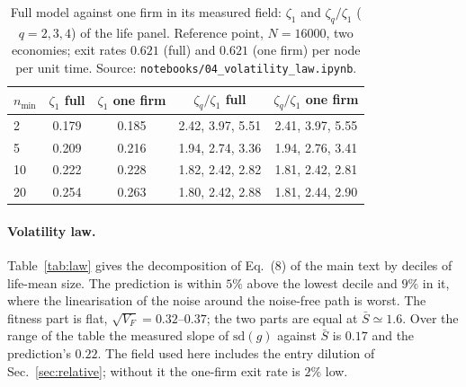 \documentclass[pre,onecolumn,superscriptaddress,nofootinbib]{revtex4-2}
\newcommand{\Sb}{\bar S}
\begin{document}
\begin{table}[h]
\caption{Full model against one firm in its measured field: $\zeta_1$ and $\zeta_q/\zeta_1$ ($q=2,3,4$) of the
life panel.  Reference point, $N=16000$, two economies; exit rates $0.621$ (full) and $0.621$ (one
firm) per node per unit time.  Source: \texttt{notebooks/04\_volatility\_law.ipynb}.}
\label{tab:reduction}
\begin{ruledtabular}
\begin{tabular}{lcccc}
$n_{\min}$ & $\zeta_1$ full & $\zeta_1$ one firm & $\zeta_q/\zeta_1$ full & $\zeta_q/\zeta_1$ one firm\\
\hline
2  & 0.179 & 0.185 & 2.42, 3.97, 5.51 & 2.41, 3.97, 5.55\\
5  & 0.209 & 0.216 & 1.94, 2.74, 3.36 & 1.94, 2.76, 3.41\\
10 & 0.222 & 0.228 & 1.82, 2.42, 2.82 & 1.81, 2.42, 2.81\\
20 & 0.254 & 0.263 & 1.80, 2.42, 2.88 & 1.81, 2.44, 2.90\\
\end{tabular}
\end{ruledtabular}
\end{table}

\paragraph{Volatility law.}  Table~\ref{tab:law} gives the decomposition of Eq.~(8) of the main text by
deciles of life-mean size.  The prediction is within $5\%$ above the lowest decile and $9\%$ in it,
where the linearisation of the noise around the noise-free path is worst.  The fitness part is flat,
$\sqrt{V_F}=0.32$--$0.37$; the two parts are equal at $\Sb\simeq1.6$.  Over the range of the table the
measured slope of $\mathrm{sd}(g)$ against $\Sb$ is $0.17$ and the prediction's $0.22$.  The field used here
includes the entry dilution of Sec.~\ref{sec:relative}; without it the one-firm exit rate is $2\%$ low.
\end{document}
